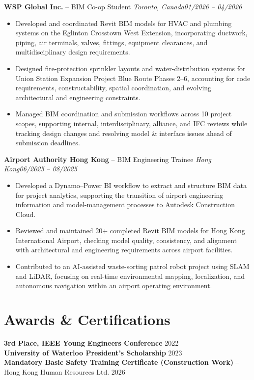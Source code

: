 \documentclass[letterpaper,10pt]{article}
\newcommand{\heading}[2]{\par\vspace{5pt}#1\hfill#2\par}
\begin{document}
\heading{\textbf{WSP Global Inc.} -- BIM Co-op Student \textbar{} \textit{Toronto, Canada}}{\textit{01/2026 -- 04/2026}}
\begin{itemize}
  \item Developed and coordinated Revit BIM models for HVAC and plumbing systems on the Eglinton Crosstown West Extension, incorporating ductwork, piping, air terminals, valves, fittings, equipment clearances, and multidisciplinary design requirements.
  \item Designed fire-protection sprinkler layouts and water-distribution systems for Union Station Expansion Project Blue Route Phases 2--6, accounting for code requirements, constructability, spatial coordination, and evolving architectural and engineering constraints.
  \item Managed BIM coordination and submission workflows across 10 project scopes, supporting internal, interdisciplinary, alliance, and IFC reviews while tracking design changes and resolving model \& interface issues ahead of submission deadlines.
\end{itemize}

\heading{\textbf{Airport Authority Hong Kong} -- BIM Engineering Trainee \textbar{} \textit{Hong Kong}}{\textit{06/2025 -- 08/2025}}
\begin{itemize}
  \item Developed a Dynamo--Power BI workflow to extract and structure BIM data for project analytics, supporting the transition of airport engineering information and model-management processes to Autodesk Construction Cloud.
  \item Reviewed and maintained 20+ completed Revit BIM models for Hong Kong International Airport, checking model quality, consistency, and alignment with architectural and engineering requirements across airport facilities.
  \item Contributed to an AI-assisted waste-sorting patrol robot project using SLAM and LiDAR, focusing on real-time environmental mapping, localization, and autonomous navigation within an airport operating environment.
\end{itemize}

\section{Awards \& Certifications}
\textbf{3rd Place, IEEE Young Engineers Conference} \textbar{} 2022\\
\textbf{University of Waterloo President's Scholarship} \textbar{} 2023\\
\textbf{Mandatory Basic Safety Training Certificate (Construction Work)} -- Hong Kong Human Resources Ltd. \textbar{} 2026
\end{document}
